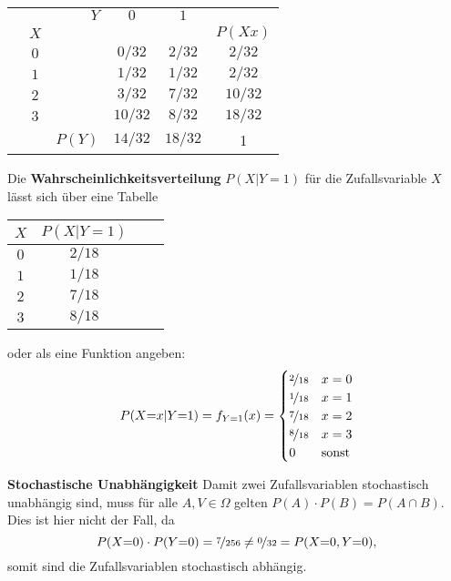 \documentclass[main.tex]{subfiles}
\begin{document}
\begin{center}
\begin{tabular}{|lcr|c|c|c|}\hline
\quad &	     &    $Y$ & $0$     & $1$     & \qquad \qquad \\
      &  $X$ &        &         &         & $P(Xx)$  \\\hline
      &  $0$ &        & $0/32$  & $2/32$  & \cellcolor{blue!30} $2/32$  \\\hline
      &  $1$ &        & $1/32$  & $1/32$  & \cellcolor{blue!30} $2/32$  \\\hline
      &  $2$ &        & $3/32$  & $7/32$  & \cellcolor{blue!30} $10/32$ \\\hline
      &  $3$ &        & $10/32$ & $8/32$  & \cellcolor{blue!30} $18/32$ \\\hline
      &      & $P(Y)$ & \cellcolor{yellow!30} $14/32$ & \cellcolor{yellow!30} $18/32$ & 1 \\\hline
\end{tabular}
\end{center}

Die \textbf{Wahrscheinlichkeitsverteilung} $P(X|Y{=}1)$ für die Zufallsvariable $X$ lässt sich über eine Tabelle 

\begin{center}
\begin{tabular}{|c|c|c|c|}\hline
$X$ & $P(X|Y{=}1)$ \\\hline
$0$ & $2/18$     \\\hline
$1$ & $1/18$     \\\hline
$2$ & $7/18$     \\\hline
$3$ & $8/18$     \\\hline
\end{tabular}
\end{center}

oder als eine Funktion angeben:
$$
P(X{=}x|Y{=}1) = f_{Y{=}1}(x) = \begin{cases}
    \nicefrac{2}{18} & x = 0 \\
    \nicefrac{1}{18} & x = 1 \\
    \nicefrac{7}{18} & x = 2 \\
    \nicefrac{8}{18} & x = 3 \\
    0                & \text{sonst}
\end{cases}
$$

\textbf{Stochastische Unabhängigkeit}
Damit zwei Zufallsvariablen stochastisch unabhängig sind, muss für alle $A, V \in \Omega$ gelten $P(A) \cdot P(B) = P(A\cap B)$. 
Dies ist hier nicht der Fall, da $$
    P(X{=}0)\cdot P(Y{=}0) = \nicefrac{7}{256} \neq \nicefrac{0}{32} = P(X{=}0, Y{=}0),
$$ somit sind die Zufallsvariablen stochastisch abhängig.
\end{document}
